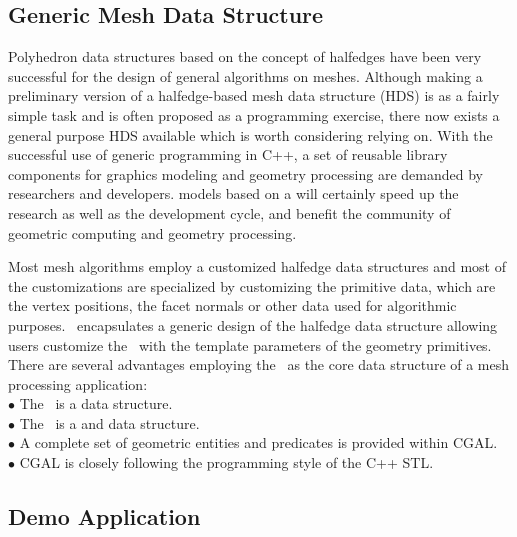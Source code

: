\documentclass[letter,twocolumn]{article}
\begin{document}
\subsection*{Generic Mesh Data Structure}

Polyhedron data structures based on the concept of halfedges have been
very successful for the design of general algorithms on meshes.
Although making a preliminary version of a halfedge-based mesh data
structure (HDS) is as a fairly simple task and is often proposed as a
programming exercise, there now exists a general purpose HDS available
which is worth considering relying on. With the successful use of
generic programming in C++, a set of reusable library components for
graphics modeling and geometry processing are demanded by researchers
and developers.  models based on a
will certainly speed up the research as well as the development cycle,
and benefit the community of geometric computing and geometry
processing.

Most mesh algorithms employ a customized halfedge data structures and
most of the customizations are specialized by customizing the
primitive data, which are the vertex positions, the facet normals or
other data used for algorithmic purposes. \cgalpoly\ encapsulates a
generic design of the halfedge data structure allowing users customize
the \poly\ with the template parameters of the geometry
primitives. There are several advantages employing the \poly\ as the
core data structure of a mesh processing application: \\

\indent $\bullet$ The \poly\ is a  data structure.\\
\indent $\bullet$ The \poly\ is a  and  
                  data structure.\\
\indent $\bullet$ A complete set of geometric entities and predicates
                  is provided within CGAL.\\
\indent $\bullet$ CGAL is closely following the programming 
                  style of the C++ STL.


\subsection*{Demo Application}
\end{document}
